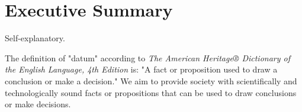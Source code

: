 \section{Executive Summary}
Self-explanatory.

The definition of "datum" according to \emph{The American Heritage® Dictionary of the English Language, 4th Edition} is: "A fact or proposition used to draw a conclusion or make a decision." We aim to provide society with scientifically and technologically sound facts or propositions that can be used to draw conclusions or make decisions.